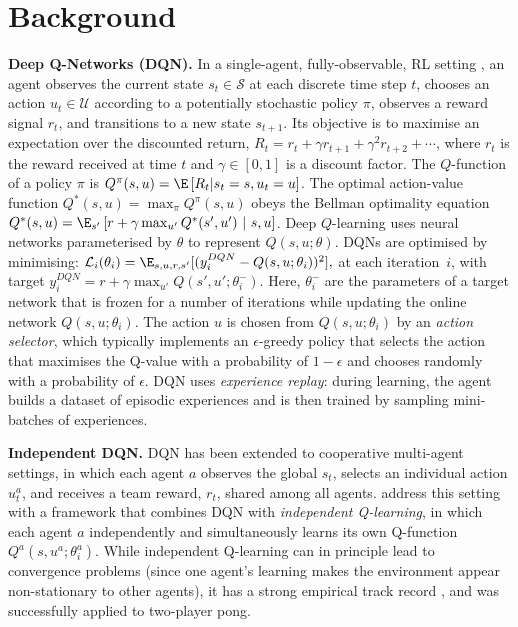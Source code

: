 \section{Background}
\label{sec:background}

\textbf{Deep Q-Networks (DQN).} In a single-agent, fully-observable, RL setting \cite{SuttonBarto:1998}, an agent observes the current state $s_t \in \mathcal{S}$ at each discrete time step $t$, chooses an action $u_t \in \mathcal{U}$ according to a potentially stochastic policy $\pi$, observes a reward signal $r_t$, and transitions to a new state $s_{t+1}$. Its objective is to maximise an expectation over the discounted return, $R_t =  r_t + \gamma r_{t+1} + \gamma^2 r_{t+2} + \cdots$, where $r_t$ is the reward received at time $t$ and $\gamma \in [0,1]$ is a discount factor.
The $Q$-function of a policy $\pi$ is $Q^{\pi}(s,u) = \E \left[  R_t | s_t = s,u_t = u \right]$. The optimal action-value function $Q^{*}(s,u) = \max_{\pi} Q^{\pi}(s,u)$ obeys the Bellman optimality equation $Q^{*}(s,u) = \E_{s'} \left[ r +  \gamma  \max_{u' } Q^{*}(s',u')~|~s,u \right]$.
Deep $Q$-learning \cite{Mnih:2015} uses neural networks parameterised by $\theta$ to represent $Q(s,u;\theta)$. DQNs are optimised by minimising:
$
\mathcal{L}_i(\theta_i) = \E_{s,u,r,s'} [( y_i^{DQN} - Q(s,u; \theta_{i}))^{2}],
\label{eq:loss}
$
at each iteration~$i$, with target $y_i^{DQN} =  r + \gamma \max_{u'} Q(s',u';\theta_{i}^{-})$. Here, $\theta_{i}^{-}$ are the parameters of a target network that is frozen for a number of iterations while updating the online network $Q(s,u; \theta_{i})$. %
The action $u$ is chosen from $Q(s,u; \theta_{i})$ by an \emph{action selector}, which typically implements an $\epsilon$-greedy policy that selects the action that maximises the Q-value with a probability of $1-\epsilon$ and chooses randomly with a probability of $\epsilon$. DQN uses \emph{experience replay}: during learning, the agent builds a dataset of episodic experiences and is then trained by sampling mini-batches of experiences.  

\textbf{Independent DQN.} DQN has been extended to cooperative multi-agent settings, in which each agent $a$ observes the global $s_t$, selects an individual action $u^a_t$, and receives a team reward, $r_t$, shared among all agents.  \citet{tampuu2015multiagent} address this setting with a framework that combines DQN with \emph{independent Q-learning}, in which each agent $a$ independently and simultaneously learns its own Q-function $Q^a(s,u^a;\theta^a_i)$.  While independent Q-learning can in principle lead to convergence problems (since one agent's learning makes the environment appear non-stationary to other agents), it has a strong empirical track record \cite{MASfoundations09,Zawadzki:2014}, and was successfully applied to two-player pong.


